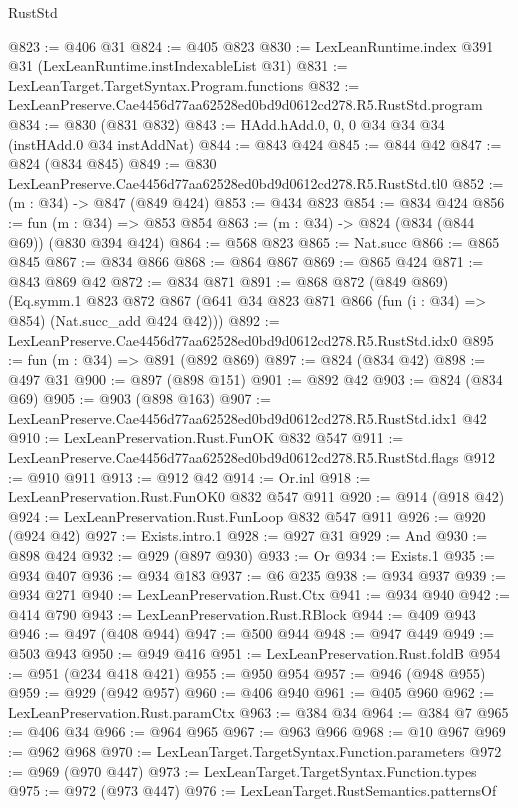 \begin{lexlean}{RustStd}
\begin{coremodule}
@823 := @406 @31
@824 := @405 @823
@830 := LexLeanRuntime.index @391 @31 (LexLeanRuntime.instIndexableList @31)
@831 := LexLeanTarget.TargetSyntax.Program.functions
@832 := LexLeanPreserve.Cae4456d77aa62528ed0bd9d0612cd278.R5.RustStd.program
@834 := @830 (@831 @832)
@843 := HAdd.hAdd.{0, 0, 0} @34 @34 @34 (instHAdd.{0} @34 instAddNat)
@844 := @843 @424
@845 := @844 @42
@847 := @824 (@834 @845)
@849 := @830 LexLeanPreserve.Cae4456d77aa62528ed0bd9d0612cd278.R5.RustStd.tl0
@852 := (m : @34) -> @847 (@849 @424)
@853 := @434 @823
@854 := @834 @424
@856 := fun (m : @34) => @853 @854
@863 := (m : @34) -> @824 (@834 (@844 @69)) (@830 @394 @424)
@864 := @568 @823
@865 := Nat.succ
@866 := @865 @845
@867 := @834 @866
@868 := @864 @867
@869 := @865 @424
@871 := @843 @869 @42
@872 := @834 @871
@891 := @868
    @872
    (@849 @869)
    (Eq.symm.{1}
      @823
      @872
      @867
      (@641 @34 @823 @871 @866 (fun (i : @34) => @854) (Nat.succ_add @424 @42)))
@892 := LexLeanPreserve.Cae4456d77aa62528ed0bd9d0612cd278.R5.RustStd.idx0
@895 := fun (m : @34) => @891 (@892 @869)
@897 := @824 (@834 @42)
@898 := @497 @31
@900 := @897 (@898 @151)
@901 := @892 @42
@903 := @824 (@834 @69)
@905 := @903 (@898 @163)
@907 := LexLeanPreserve.Cae4456d77aa62528ed0bd9d0612cd278.R5.RustStd.idx1 @42
@910 := LexLeanPreservation.Rust.FunOK @832 @547
@911 := LexLeanPreserve.Cae4456d77aa62528ed0bd9d0612cd278.R5.RustStd.flags
@912 := @910 @911
@913 := @912 @42
@914 := Or.inl
@918 := LexLeanPreservation.Rust.FunOK0 @832 @547 @911
@920 := @914 (@918 @42)
@924 := LexLeanPreservation.Rust.FunLoop @832 @547 @911
@926 := @920 (@924 @42)
@927 := Exists.intro.{1}
@928 := @927 @31
@929 := And
@930 := @898 @424
@932 := @929 (@897 @930)
@933 := Or
@934 := Exists.{1}
@935 := @934 @407
@936 := @934 @183
@937 := @6 @235
@938 := @934 @937
@939 := @934 @271
@940 := LexLeanPreservation.Rust.Ctx
@941 := @934 @940
@942 := @414 @790
@943 := LexLeanPreservation.Rust.RBlock
@944 := @409 @943
@946 := @497 (@408 @944)
@947 := @500 @944
@948 := @947 @449
@949 := @503 @943
@950 := @949 @416
@951 := LexLeanPreservation.Rust.foldB
@954 := @951 (@234 @418 @421)
@955 := @950 @954
@957 := @946 (@948 @955)
@959 := @929 (@942 @957)
@960 := @406 @940
@961 := @405 @960
@962 := LexLeanPreservation.Rust.paramCtx
@963 := @384 @34
@964 := @384 @7
@965 := @406 @34
@966 := @964 @965
@967 := @963 @966
@968 := @10 @967
@969 := @962 @968
@970 := LexLeanTarget.TargetSyntax.Function.parameters
@972 := @969 (@970 @447)
@973 := LexLeanTarget.TargetSyntax.Function.types
@975 := @972 (@973 @447)
@976 := LexLeanTarget.RustSemantics.patternsOf

\end{coremodule}
\end{lexlean}
